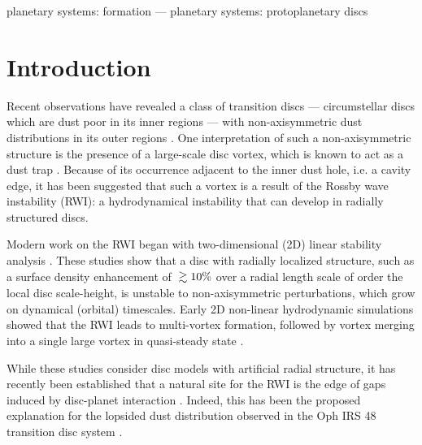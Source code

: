\documentclass[useAMS,usenatbib]{mn2e}
\newcommand{\gtrsim}{\;\raisebox{-.8ex}{$\buildrel{\textstyle>}\over\sim$}\;}
\begin{document}
\begin{keywords}
planetary systems: formation --- planetary systems:
protoplanetary discs
\end{keywords}


\section{Introduction}\label{intro}


Recent observations have revealed a class of transition discs ---
circumstellar discs which are dust poor in its inner regions ---  
with non-axisymmetric dust distributions in its outer 
regions \citep{brown09,mayama12,marel13,isella13}.  
One interpretation of such a non-axisymmetric structure is the presence of
a large-scale disc vortex, which is known to act as a dust trap
\citep{barge95,inaba06,birnstiel13,ataiee13,lyra13}.  
Because of its occurrence adjacent to the inner dust
hole, i.e. a cavity edge, it has been suggested that such a vortex is
a result of the Rossby wave instability (RWI): a hydrodynamical instability
that can develop in radially structured discs. 

Modern work on the RWI began with two-dimensional (2D) linear
stability analysis \citep{lovelace99,li00}. These studies show that a
disc with radially localized 
structure, such as a surface density enhancement of $\gtrsim 10\%$ over a
radial length scale of order the local disc scale-height, is unstable to
non-axisymmetric perturbations, which grow on dynamical (orbital)
timescales. Early 2D non-linear hydrodynamic simulations showed that
the RWI leads to multi-vortex formation, followed by vortex merging into
a single large vortex in quasi-steady state \citep{li01,inaba06}. 

While these studies consider disc models with artificial radial
structure, it has recently been established that a natural site for
the RWI is the edge of gaps induced by disc-planet interaction 
\citep{koller03,li05,valborro07,li09,lyra09b,lin10,lin11a}. Indeed, this has
been the proposed explanation for the lopsided dust distribution
observed in the Oph IRS 48 transition disc system
\citep{marel13}. %
\end{document}
